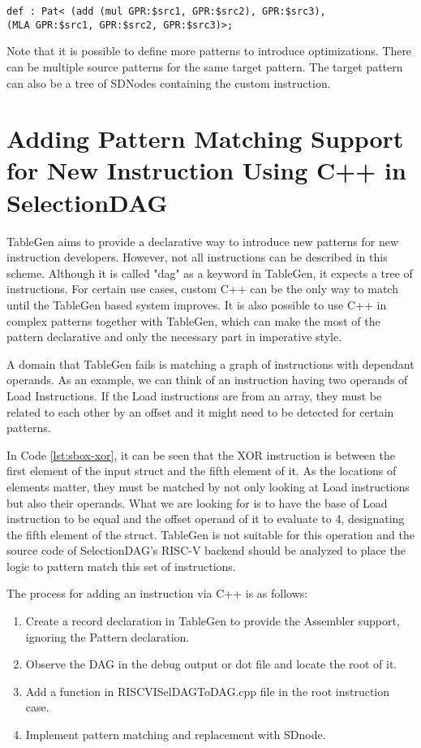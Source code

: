 \begin{lstlisting}
def : Pat< (add (mul GPR:$src1, GPR:$src2), GPR:$src3),
(MLA GPR:$src1, GPR:$src2, GPR:$src3)>;
\end{lstlisting}

Note that it is possible to define more patterns to introduce optimizations. There can be multiple source patterns for the same target pattern. The target pattern can also be a tree of SDNodes containing the custom instruction.

\section{Adding Pattern Matching Support for New Instruction Using C++ in SelectionDAG}\label{sec:cpp}
TableGen aims to provide a declarative way to introduce new patterns for new instruction developers. However, not all instructions can be described in this scheme.  Although it is called "dag" as a keyword in TableGen, it expects a tree of instructions. For certain use cases, custom C++ can be the only way to match until the TableGen based system improves. It is also possible to use C++ in complex patterns together with TableGen, which can make the most of the pattern declarative and only the necessary part in imperative style.
\par
A domain that TableGen fails is matching a graph of instructions with dependant operands. As an example, we can think of an instruction having two operands of Load Instructions. If the Load instructions are from an array, they must be related to each other by an offset and it might need to be detected for certain patterns.




In Code \ref{lst:sbox-xor}, it can be seen that the XOR instruction is between the first element of the input struct and the fifth element of it. As the locations of elements matter, they must be matched by not only looking at Load instructions but also their operands. What we are looking for is to have the base of Load instruction to be equal and the offset operand of it to evaluate to 4, designating the fifth element of the struct. TableGen is not suitable for this operation and the source code of SelectionDAG's RISC-V backend should be analyzed to place the logic to pattern match this set of instructions.

The process for adding an instruction via C++ is as follows:
\begin{enumerate}
    \item Create a record declaration in TableGen to provide the Assembler support, ignoring the Pattern declaration.
    \item Observe the DAG in the debug output or dot file and locate the root of it. 
    \item Add a function in RISCVISelDAGToDAG.cpp file in the root instruction case. 
    \item Implement pattern matching and replacement with SDnode.
\end{enumerate}

